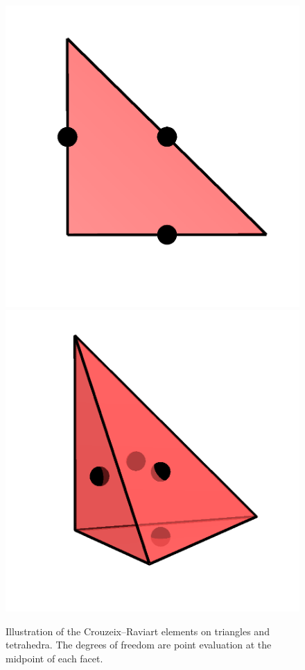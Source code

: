 \begin{figure}
  \centering
  \includegraphics[width=\twofigs]{chapters/kirby-6/png/CR1_2d.png}
  \includegraphics[width=\twofigs]{chapters/kirby-6/png/CR1_3d.png}
  \caption{Illustration of the Crouzeix--Raviart elements on
    triangles and tetrahedra. The degrees of freedom are point
    evaluation at the midpoint of each facet.}
  \label{kirby-6:fig:cr:tri}
\end{figure}

